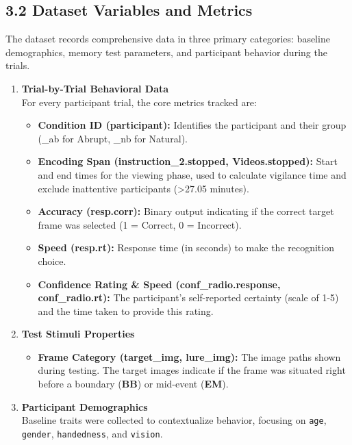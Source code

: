 \documentclass[10pt,a4paper]{article}
\begin{document}
\subsection{3.2 Dataset Variables and Metrics}
The dataset records comprehensive data in three primary categories: baseline demographics, memory test parameters, and participant behavior during the trials.

\begin{enumerate}
    \item \textbf{Trial-by-Trial Behavioral Data} \\
    For every participant trial, the core metrics tracked are:
    \begin{itemize}
        \item \textbf{Condition ID (participant):} Identifies the participant and their group (\_ab for Abrupt, \_nb for Natural).
        \item \textbf{Encoding Span (instruction\_2.stopped, Videos.stopped):} Start and end times for the viewing phase, used to calculate vigilance time and exclude inattentive participants (\textgreater 27.05 minutes).
        \item \textbf{Accuracy (resp.corr):} Binary output indicating if the correct target frame was selected (1 = Correct, 0 = Incorrect).
        \item \textbf{Speed (resp.rt):} Response time (in seconds) to make the recognition choice.
        \item \textbf{Confidence Rating \& Speed (conf\_radio.response, conf\_radio.rt):} The participant’s self-reported certainty (scale of 1-5) and the time taken to provide this rating.
    \end{itemize}

    \item \textbf{Test Stimuli Properties}
    \begin{itemize}
        \item \textbf{Frame Category (target\_img, lure\_img):} The image paths shown during testing. The target images indicate if the frame was situated right before a boundary (\textbf{BB}) or mid-event (\textbf{EM}).
    \end{itemize}

    \item \textbf{Participant Demographics} \\
    Baseline traits were collected to contextualize behavior, focusing on \texttt{age}, \texttt{gender}, \texttt{handedness}, and \texttt{vision}.
\end{enumerate}
\end{document}
